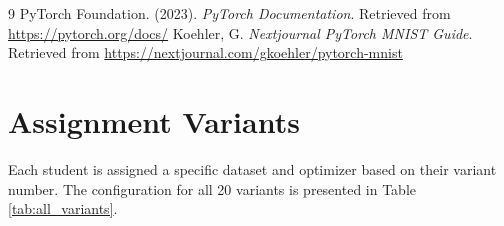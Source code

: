 \documentclass[12pt, a4paper]{article}
\begin{document}
\vspace{1cm}
\begin{thebibliography}{9}
    PyTorch Foundation. (2023). \textit{PyTorch Documentation}. Retrieved from \url{https://pytorch.org/docs/}
    Koehler, G. \textit{Nextjournal PyTorch MNIST Guide}. Retrieved from \url{https://nextjournal.com/gkoehler/pytorch-mnist}
\end{thebibliography}
\newpage
\appendix
\section{Assignment Variants}
Each student is assigned a specific dataset and optimizer based on their variant number. The configuration for all 20 variants is presented in Table \ref{tab:all_variants}.
\end{document}
